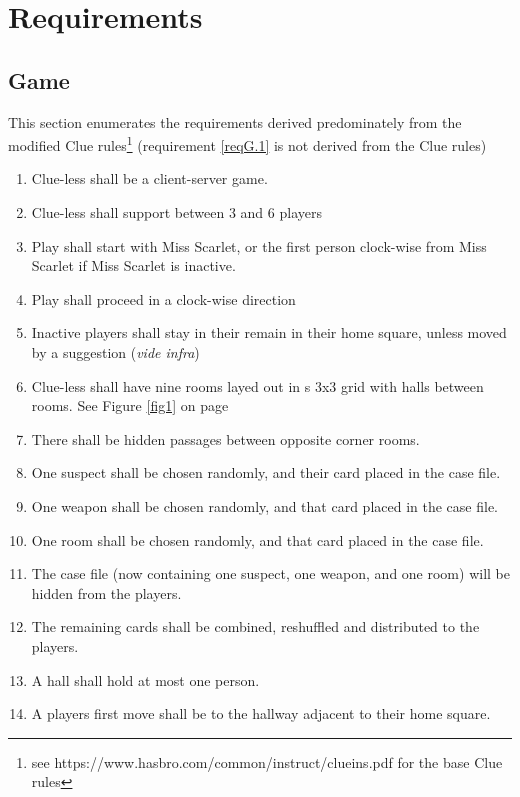 \documentclass[10pt]{article}
\begin{document}
\section[Requirements]{Requirements}
\subsection[Game]{Game} \label{gameReqs}
This section enumerates the requirements derived predominately from the modified Clue rules\footnote{see https://www.hasbro.com/common/instruct/clueins.pdf for the base Clue rules} (requirement \ref{reqG.1} is not derived from the Clue rules)
\begin{enumerate}[label=G.\arabic*]
\item \label{reqG.1}Clue-less shall be a client-server game.
\item \label{reqG.2}Clue-less shall support between 3 and 6 players
\item \label{reqG.3}Play shall start with Miss Scarlet, or the first person clock-wise from Miss Scarlet if Miss Scarlet is inactive.
\item \label{reqG.4}Play shall proceed in a clock-wise direction
\item \label{reqG.5}Inactive players shall stay in their remain in their home square, unless moved by a suggestion ({\em vide infra})
\item \label{reqG.6}Clue-less shall have nine rooms layed out in s 3x3 grid with halls between rooms.  See Figure \ref{fig1} on page \pageref{fig1}
\item \label{reqG.7}There shall be hidden passages between opposite corner rooms.
\item \label{reqG.8}One suspect shall be chosen randomly, and their card placed in the case file.
\item \label{reqG.9}One weapon shall be chosen randomly, and that card placed in the case file.
\item \label{reqG.10}One room shall be chosen randomly, and that card placed in the case file.
\item \label{reqG.11} The case file (now containing one suspect, one weapon, and one room) will be hidden from the players.
\item \label{reqG.12} The remaining cards shall be combined, reshuffled and distributed  to the players.
\item \label{reqG.13 }A hall shall hold at most one person.
\item \label{reqG.14} A players first move shall be to the hallway adjacent to their home square.

\end{enumerate}
\end{document}
